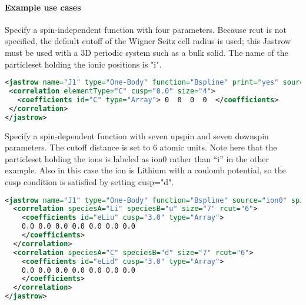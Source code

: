 \paragraph{Example use cases}
\label{sec:1bjsplineexamples}

Specify a spin-independent function with four parameters. Because rcut  is not 
specified, the default cutoff of the Wigner Seitz cell radius is used; this 
Jastrow must be used with a 3D periodic system such as a bulk solid. The name of 
the particleset holding the ionic positions is "i".
\begin{lstlisting}[language=xml]
<jastrow name="J1" type="One-Body" function="Bspline" print="yes" source="i">
 <correlation elementType="C" cusp="0.0" size="4">
   <coefficients id="C" type="Array"> 0  0  0  0  </coefficients>
 </correlation>
</jastrow>
\end{lstlisting}

Specify a spin-dependent function with seven upspin and seven downspin parameters. 
The cutoff distance is set to 6 atomic units.  Note here that the particleset holding
the ions is labeled as ion0 rather than ``i'' in the other example.  Also in this case
the ion is Lithium with a coulomb potential, so the cusp condition is satisfied by 
setting cusp="d".
\begin{lstlisting}[language=xml]
<jastrow name="J1" type="One-Body" function="Bspline" source="ion0" spin="yes">
  <correlation speciesA="Li" speciesB="u" size="7" rcut="6">
    <coefficients id="eLiu" cusp="3.0" type="Array"> 
    0.0 0.0 0.0 0.0 0.0 0.0 0.0
    </coefficients>
  </correlation>
  <correlation speciesA="C" speciesB="d" size="7" rcut="6">
    <coefficients id="eLid" cusp="3.0" type="Array"> 
    0.0 0.0 0.0 0.0 0.0 0.0 0.0
    </coefficients>
  </correlation>
</jastrow>
\end{lstlisting}

